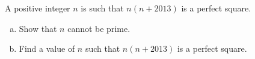 \documentclass[varwidth]{standalone}
\begin{document}
    A positive integer $n$ is such that $n(n + 2013)$ is a perfect square.
    \begin{enumerate}[a)]
        \item Show that $n$ cannot be prime.
        \item Find a value of $n$ such that $n(n + 2013)$ is a perfect square.
    \end{enumerate}
\end{document}
